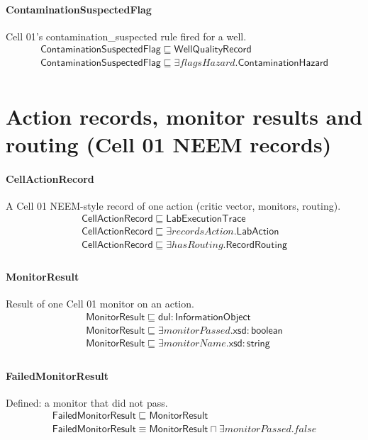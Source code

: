 \documentclass[10pt]{article}
\begin{document}
\paragraph{ContaminationSuspectedFlag} Cell 01's contamination\_suspected rule fired for a well.
\[\begin{array}{l}
\mathsf{ContaminationSuspectedFlag} \sqsubseteq  \mathsf{WellQualityRecord} \\
\mathsf{ContaminationSuspectedFlag} \sqsubseteq  \exists \mathit{flagsHazard}.\mathsf{ContaminationHazard} \\
\end{array}\]
\section*{Action records, monitor results and routing (Cell 01 NEEM records)}
\paragraph{CellActionRecord} A Cell 01 NEEM-style record of one action (critic vector, monitors, routing).
\[\begin{array}{l}
\mathsf{CellActionRecord} \sqsubseteq  \mathsf{LabExecutionTrace} \\
\mathsf{CellActionRecord} \sqsubseteq  \exists \mathit{recordsAction}.\mathsf{LabAction} \\
\mathsf{CellActionRecord} \sqsubseteq  \exists \mathit{hasRouting}.\mathsf{RecordRouting} \\
\end{array}\]
\paragraph{MonitorResult} Result of one Cell 01 monitor on an action.
\[\begin{array}{l}
\mathsf{MonitorResult} \sqsubseteq  \mathsf{dul{:}InformationObject} \\
\mathsf{MonitorResult} \sqsubseteq  \exists \mathit{monitorPassed}.\mathsf{xsd{:}boolean} \\
\mathsf{MonitorResult} \sqsubseteq  \exists \mathit{monitorName}.\mathsf{xsd{:}string} \\
\end{array}\]
\paragraph{FailedMonitorResult} Defined: a monitor that did not pass.
\[\begin{array}{l}
\mathsf{FailedMonitorResult} \sqsubseteq  \mathsf{MonitorResult} \\
\mathsf{FailedMonitorResult} \equiv  \mathsf{MonitorResult} \sqcap  \exists \mathit{monitorPassed}.{false} \\
\end{array}\]
\end{document}

